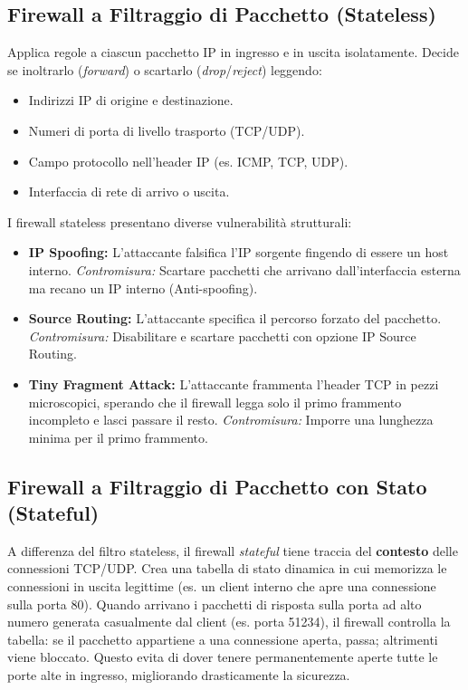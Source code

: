 \subsection{Firewall a Filtraggio di Pacchetto (Stateless)}

Applica regole a ciascun pacchetto IP in ingresso e in uscita isolatamente. Decide se inoltrarlo (\textit{forward}) o scartarlo (\textit{drop}/\textit{reject}) leggendo:
\begin{itemize}
    \item Indirizzi IP di origine e destinazione.
    \item Numeri di porta di livello trasporto (TCP/UDP).
    \item Campo protocollo nell'header IP (es. ICMP, TCP, UDP).
    \item Interfaccia di rete di arrivo o uscita.
\end{itemize}

\begin{warnbox}
I firewall stateless presentano diverse vulnerabilità strutturali:
\begin{itemize}
    \item \textbf{IP Spoofing:} L'attaccante falsifica l'IP sorgente fingendo di essere un host interno. \textit{Contromisura:} Scartare pacchetti che arrivano dall'interfaccia esterna ma recano un IP interno (Anti-spoofing).
    \item \textbf{Source Routing:} L'attaccante specifica il percorso forzato del pacchetto. \textit{Contromisura:} Disabilitare e scartare pacchetti con opzione IP Source Routing.
    \item \textbf{Tiny Fragment Attack:} L'attaccante frammenta l'header TCP in pezzi microscopici, sperando che il firewall legga solo il primo frammento incompleto e lasci passare il resto. \textit{Contromisura:} Imporre una lunghezza minima per il primo frammento.
\end{itemize}
\end{warnbox}

\subsection{Firewall a Filtraggio di Pacchetto con Stato (Stateful)}

A differenza del filtro stateless, il firewall \textit{stateful} tiene traccia del \textbf{contesto} delle connessioni TCP/UDP.
Crea una tabella di stato dinamica in cui memorizza le connessioni in uscita legittime (es. un client interno che apre una connessione sulla porta 80). Quando arrivano i pacchetti di risposta sulla porta ad alto numero generata casualmente dal client (es. porta 51234), il firewall controlla la tabella: se il pacchetto appartiene a una connessione aperta, passa; altrimenti viene bloccato. Questo evita di dover tenere permanentemente aperte tutte le porte alte in ingresso, migliorando drasticamente la sicurezza.

